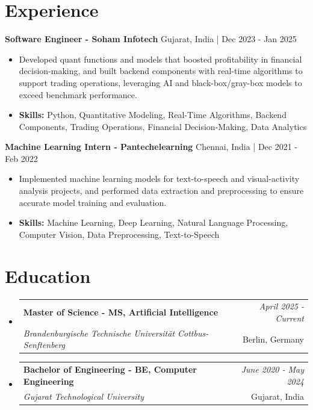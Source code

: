 \documentclass[a4paper,11pt]{article}
\makeatletter
\newcommand{\resumeSubheading}[4]{
\vspace{0.5mm}\item
    \begin{tabular*}{\linewidth}[t]{l@{\extracolsep{\fill}}r}
        \textbf{#1} & \textit{\footnotesize{#4}} \\
        \textit{\footnotesize{#3}} &  \footnotesize{#2}\\
    \end{tabular*}
    \vspace{-2.4mm}
}
\makeatother
\begin{document}
\section{\textbf{Experience}}


\vspace{1mm}
  \textbf{Software Engineer - Soham Infotech} \hfill Gujarat, India | Dec 2023 - Jan 2025
\vspace{-1.5mm} %
\begin{itemize}
  \item Developed quant functions and models that boosted profitability in financial decision-making, and built backend components with real-time algorithms to support trading operations, leveraging AI and black-box/gray-box models to exceed benchmark performance.

\vspace{-2mm}
  \item \textbf{Skills:} Python, Quantitative Modeling, Real-Time Algorithms, Backend Components, Trading Operations, Financial Decision-Making, Data Analytics
\end{itemize}

\vspace{1mm}
  \textbf{Machine Learning Intern - Pantechelearning} \hfill Chennai, India | Dec 2021 - Feb 2022
\vspace{-1.5mm} %
\begin{itemize}
  \item Implemented machine learning models for text-to-speech and visual-activity analysis projects, and performed data extraction and preprocessing to ensure accurate model training and evaluation.
\vspace{-2mm}
  \item \textbf{Skills:} Machine Learning, Deep Learning, Natural Language Processing, Computer Vision, Data Preprocessing, Text-to-Speech
\end{itemize}\section{\textbf{Education}}
\vspace{-0.4mm}

\begin{itemize}[leftmargin=0.15in, label={}]
\resumeSubheading
{Master of Science - MS, Artificial Intelligence }{Berlin, Germany}
{Brandenburgische Technische Universität Cottbus-Senftenberg  }{April 2025 - Current}

\vspace{1.0mm} %
\resumeSubheading
{Bachelor of Engineering - BE, Computer Engineering  }{Gujarat, India}
{Gujarat Technological University }{June 2020 - May 2024}

\end{itemize}
\end{document}
